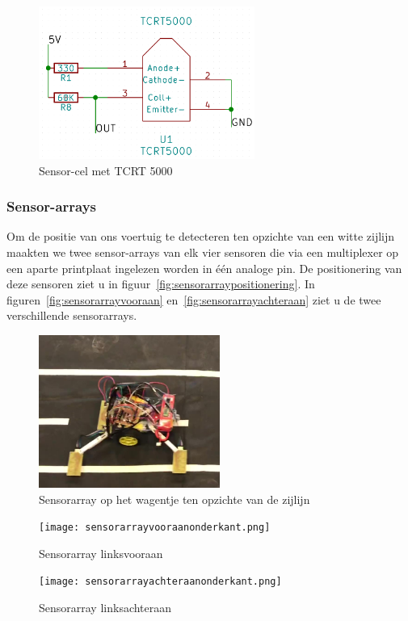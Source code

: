 \begin{figure}[H]
	\centering
	\includegraphics[height=5cm]{tcrt5000cel.png}
	\caption{Sensor-cel met TCRT 5000\label{fig:tcrt5000cel}}
\end{figure}

\subsubsection*{Sensor-arrays}
Om de positie van ons voertuig te detecteren ten opzichte van een witte zijlijn maakten we twee sensor-arrays van elk vier sensoren die via een multiplexer op een aparte printplaat ingelezen worden in \'e\'en analoge pin. De positionering van deze sensoren ziet u in figuur~\vref{fig:sensorarraypositionering}. In figuren~\vref{fig:sensorarrayvooraan} en~\vref{fig:sensorarrayachteraan} ziet u de twee verschillende sensorarrays.

\begin{figure}[H]
	\centering
	\includegraphics[height=5cm]{sensorarraypositionering.png}
	\caption{Sensorarray op het wagentje ten opzichte van de zijlijn\label{fig:sensorarraypositionering}}
\end{figure}

\begin{figure}[H]
	\centering
	\begin{minipage}[b]{0.4\textwidth}
		\centering
		\texttt{[image: sensorarrayvooraanonderkant.png]}
		\caption{Sensorarray linksvooraan}
		\label{fig:sensorarrayvooraan}
	\end{minipage}
	\hfill
	\begin{minipage}[b]{0.4\textwidth}
		\centering
		\texttt{[image: sensorarrayachteraanonderkant.png]}
		\caption{Sensorarray linksachteraan}
		\label{fig:sensorarrayachteraan}
	\end{minipage}
\end{figure}

